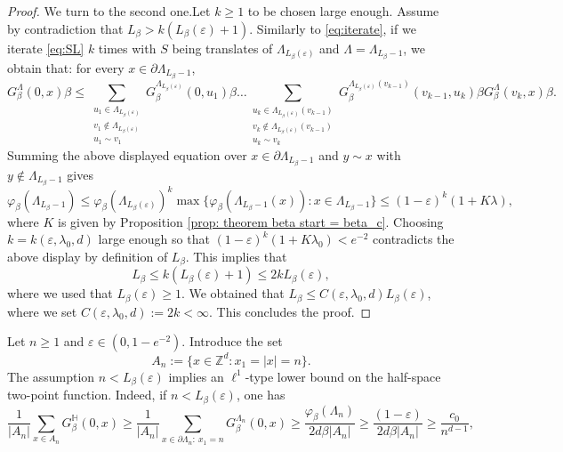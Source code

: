 \documentclass[11pt,a4paper]{article}
\numberwithin{equation}{section}
\theoremstyle{plain}
\theoremstyle{definition}
\begin{document}
\begin{proof}
We turn to the second one.Let $k\geq 1$ to be chosen large enough. Assume by contradiction that $L_\beta>k(L_\beta(\varepsilon)+1)$. Similarly to \eqref{eq:iterate}, if we iterate \eqref{eq:SL} $k$ times with $S$ being translates of $\Lambda_{L_\beta(\varepsilon)}$ and $\Lambda=\Lambda_{L_\beta-1}$, we obtain that: for every $x\in \partial \Lambda_{L_\beta-1}$,
\begin{equation}
	G_\beta^{\Lambda}(0,x)\beta\leq \sum_{\substack{u_1\in \Lambda_{L_\beta(\varepsilon)}\\v_1\notin \Lambda_{L_\beta(\varepsilon)}\\ u_1\sim v_1}}G_\beta^{\Lambda_{L_\beta(\varepsilon)}}(0,u_1)\beta\ldots\sum_{\substack{u_k\in \Lambda_{L_\beta(\varepsilon)}(v_{k-1})\\v_k\notin \Lambda_{L_\beta(\varepsilon)}(v_{k-1})\\ u_k\sim v_k}}G_\beta^{\Lambda_{L_\beta(\varepsilon)}(v_{k-1})}(v_{k-1},u_k)\beta G_\beta^\Lambda(v_k,x)\beta.
	\end{equation}
Summing the above displayed equation over $x\in \partial\Lambda_{L_\beta-1}$ and $y\sim x$ with $y\notin \Lambda_{L_\beta-1}$ gives
\begin{equation}
\varphi_\beta(\Lambda_{L_\beta-1})\le \varphi_\beta(\Lambda_{L_\beta(\varepsilon)})^k\max\{\varphi_\beta(\Lambda_{L_\beta-1}(x)):x\in \Lambda_{L_\beta-1}\}\le (1-\varepsilon)^k(1+K\lambda),
\end{equation}
where $K$ is given by Proposition \ref{prop: theorem beta start = beta_c}. Choosing $k=k(\varepsilon,\lambda_0,d)$ large enough so that $(1-\varepsilon)^k(1+K\lambda_0)<e^{-2}$ contradicts the above display by definition of $L_\beta$. This implies that 
\begin{equation}L_\beta\le k(L_\beta(\varepsilon)+1)\leq 2kL_\beta(\varepsilon),\end{equation} where we used that $L_\beta(\varepsilon)\geq 1$.
We obtained that $L_\beta \le C(\varepsilon,\lambda_0,d) L_\beta(\varepsilon)$, where we set $C(\varepsilon,\lambda_0,d):=2k<\infty$. This concludes the proof.
\end{proof}
Let $n\geq 1$ and $\varepsilon\in(0,1-e^{-2})$. Introduce the set
\begin{equation}\label{eq: def An}
	A_n:=\{x\in \mathbb Z^d: x_1=|x|=n\}.
\end{equation}
The assumption $n<L_\beta(\varepsilon)$ implies an $\ell^1$-type lower bound on the half-space two-point function. Indeed, if $n< L_\beta(\varepsilon)$, one has
\begin{equation}\label{eq:averaged lower bound half-space}
	\frac{1}{|A_n|}\sum_{x\in A_n}G_\beta^{\mathbb H}(0,x)\geq \frac{1}{|A_n|}\sum_{x\in \partial \Lambda_n:\: x_1=n}G_\beta^{\Lambda_n}(0,x)\geq \frac{\varphi_\beta(\Lambda_n)}{2d\beta|A_n|}\geq \frac{(1-\varepsilon)}{2d\beta|A_n|}\geq \frac{c_0}{n^{d-1}},
\end{equation}
\end{document}
